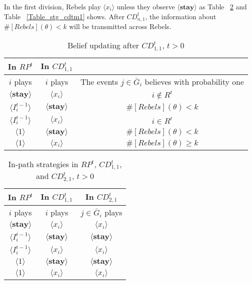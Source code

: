\documentclass[12pt,letterpaper]{article}
\newtheorem*{main result}{Main Result}
\theoremstyle{definition}
\theoremstyle{remark}
\theoremstyle{claim}
\begin{document}
In the first division, Rebels play $\langle x_i \rangle$ unless they observe $\langle \textbf{stay} \rangle$ as Table ~\ref{Table_stg_cdt21} and Table ~\ref{Table_stg_cdtm1} shows. After $CD^t_{n,1}$, the information about $\#[Rebels](\theta)< k$ will be transmitted across Rebels. 
\begin{table}[ht]
\caption{Belief updating after $CD^t_{1,1}$, $t>0$}
\label{Table_blf_up_cdt11}
\begin{center}
\begin{tabular}{c c c}
In $RP^t$ 	&  	In $CD^t_{1,1}$		&  \\
\hline
\hline
$i$ plays 		&  	$i$ plays		& The events $j\in \bar{G}_i$ believes with probability one  \\
\hline
$\langle  \textbf{stay} \rangle$ 	& 	$\langle x_i \rangle$	    & $i\notin R^t$ \\
$\langle  {I^{t-1}_i} \rangle$ 		&  $\langle \textbf{stay} \rangle$		& $\#[Rebels](\theta)< k$     \\
$\langle  {I^{t-1}_i} \rangle$ 		&  $\langle x_i \rangle$		& $i\in R^t$     \\
$\langle 1 \rangle$ 		             &  $\langle \textbf{stay} \rangle$		& $\#[Rebels](\theta)< k$  \\
$\langle 1 \rangle$ 		             &  $\langle x_i \rangle$		&  $\#[Rebels](\theta)\geq k$ 
\end{tabular}
\end{center}
\end{table}



\begin{table}[ht]
\caption{In-path strategies in $RP^t$, $CD^t_{1,1}$, and $CD^t_{2,1}$, $t>0$}
\label{Table_stg_cdt21}
\begin{center}
\begin{tabular}{c c c}
In $RP^t$ 	 	&  	In $CD^t_{1,1}$		&  In $CD^t_{2,1}$	\\
\hline
\hline
$i$ plays 		  							&  	$i$ plays									& $j\in \bar{G}_{i}$ plays  \\
\hline
$\langle  \textbf{stay} \rangle$ 	& 	$\langle x_i \rangle$	    & $\langle x_i \rangle$ \\
$\langle  {I^{t-1}_i} \rangle$ 		&  $\langle \textbf{stay} \rangle$		& $\langle \textbf{stay} \rangle$     \\
$\langle  {I^{t-1}_i} \rangle$ 		&  $\langle x_i \rangle$		& $\langle x_i \rangle$     \\
$\langle 1 \rangle$ 		             &  $\langle \textbf{stay} \rangle$		& $\langle \textbf{stay} \rangle$  \\
$\langle 1 \rangle$ 		             &  $\langle x_i \rangle$		&  $\langle x_i \rangle$  
\end{tabular}
\end{center}
\end{table}
\end{document}
